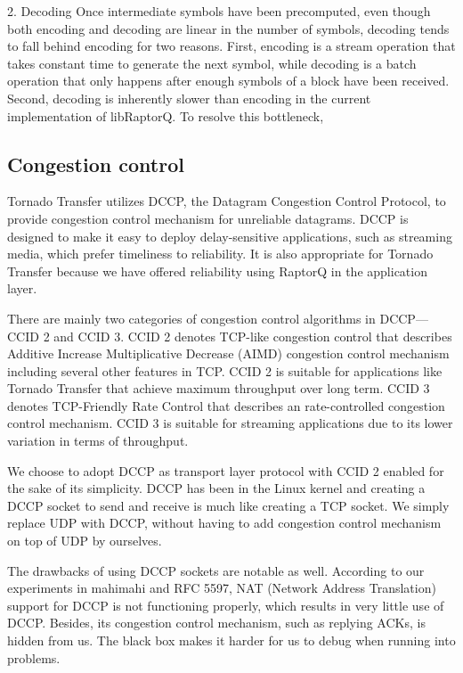\documentclass{sig-alternate-10pt}
\begin{document}
2. Decoding Once intermediate symbols have been precomputed, even though both
encoding and decoding are linear in the number of symbols, decoding tends to
fall behind encoding for two reasons. First, encoding is a stream operation
that takes constant time to generate the next symbol, while decoding is a batch
operation that only happens after enough symbols of a block have been received.
Second, decoding is inherently slower than encoding in the current
implementation of libRaptorQ. To resolve this bottleneck, 

\subsection{Congestion control}
Tornado Transfer utilizes DCCP, the Datagram Congestion Control Protocol, to provide congestion control mechanism for unreliable datagrams. DCCP is designed to make it easy to deploy delay-sensitive applications, such as streaming media, which prefer timeliness to reliability. It is also appropriate for Tornado Transfer because we have offered reliability using RaptorQ in the application layer. 

There are mainly two categories of congestion control algorithms in DCCP--- CCID 2 and CCID 3. CCID 2 denotes TCP-like congestion control that describes Additive Increase Multiplicative Decrease (AIMD) congestion control mechanism including several other features in TCP. CCID 2 is suitable for applications like Tornado Transfer that achieve maximum throughput over long term. CCID 3 denotes TCP-Friendly Rate Control that describes an rate-controlled congestion control mechanism. CCID 3 is suitable for streaming applications due to its lower variation in terms of throughput.

We choose to adopt DCCP as transport layer protocol with CCID 2 enabled for the sake of its simplicity. DCCP has been in the Linux kernel and creating a DCCP socket to send and receive is much like creating a TCP socket. We simply replace UDP with DCCP, without having to add congestion control mechanism on top of UDP by ourselves.

The drawbacks of using DCCP sockets are notable as well. According to our experiments in mahimahi and RFC 5597, NAT (Network Address Translation) support for DCCP is not functioning properly, which results in very little use of DCCP. Besides, its congestion control mechanism, such as replying ACKs, is hidden from us. The black box makes it harder for us to debug when running into problems.
\end{document}
